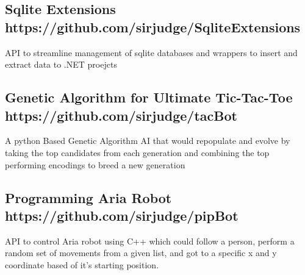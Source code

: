 \subsection{Sqlite Extensions \hfill https://github.com/sirjudge/SqliteExtensions}
\begin{zitemize}
\item API to streamline management of sqlite databases and wrappers to insert and extract data to .NET proejcts
\end{zitemize}

\subsection{{Genetic Algorithm for Ultimate Tic-Tac-Toe  \hfill  https://github.com/sirjudge/tacBot }}
\begin{zitemize}
\item A python Based Genetic Algorithm AI that would repopulate and evolve by taking the top candidates from each generation and combining the top performing encodings to breed a new generation
\end{zitemize}
 
\subsection{{Programming Aria Robot \hfill https://github.com/sirjudge/pipBot}} 
\begin{zitemize}
\item API to control Aria robot using C++ which could follow a person, perform a random set of movements from a given list, and got to a specific x and y coordinate based of it's starting position. 
\end{zitemize}